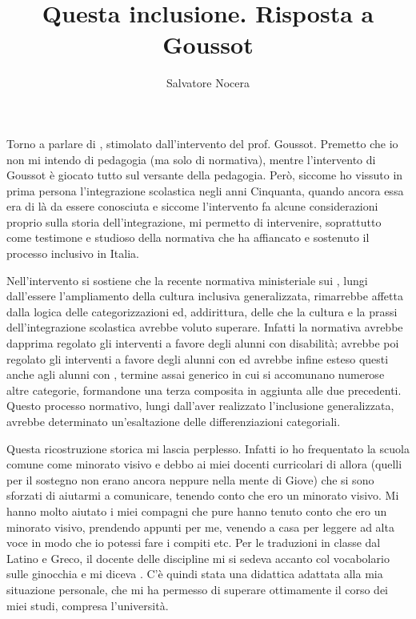 \author{Salvatore Nocera}
\title{Questa inclusione. Risposta a Goussot}
\label{cha:nocera300713}
\maketitle
{}
Torno a parlare di , stimolato dall'intervento del prof. Goussot\pageref{Goussot190713}. Premetto che io non mi intendo di pedagogia (ma solo di normativa), mentre l'intervento di Goussot è giocato tutto sul versante della pedagogia. Però, siccome ho vissuto in prima persona l'integrazione scolastica negli anni Cinquanta, quando ancora essa era di là da essere conosciuta e siccome l'intervento fa alcune considerazioni proprio sulla storia dell'integrazione, mi permetto di intervenire, soprattutto come testimone e studioso della normativa che ha affiancato e sostenuto il processo inclusivo in Italia.

Nell'intervento si sostiene che la recente normativa ministeriale sui , lungi dall'essere l'ampliamento della cultura inclusiva generalizzata, rimarrebbe affetta dalla logica delle categorizzazioni ed, addirittura, delle  che la cultura e la prassi dell'integrazione scolastica avrebbe voluto superare. Infatti la normativa avrebbe dapprima regolato gli interventi a favore degli alunni con disabilità; avrebbe poi regolato gli interventi a favore degli alunni con  ed avrebbe infine esteso questi anche agli alunni con , termine assai generico in cui si accomunano numerose altre categorie, formandone una terza composita in aggiunta alle due precedenti. Questo processo normativo, lungi dall'aver realizzato l'inclusione generalizzata, avrebbe determinato un'esaltazione delle differenziazioni categoriali.

Questa ricostruzione storica mi lascia perplesso. Infatti io ho frequentato la scuola comune come minorato visivo e debbo ai miei docenti curricolari di allora (quelli per il sostegno non erano ancora neppure nella mente di Giove) che si sono sforzati di aiutarmi a comunicare, tenendo conto che ero un minorato visivo. Mi hanno molto aiutato i miei compagni che pure hanno tenuto conto che ero un minorato visivo, prendendo appunti per me, venendo a casa per leggere ad alta voce in modo che io potessi fare i compiti etc. Per le traduzioni in classe dal Latino e Greco, il docente delle discipline mi si sedeva accanto col vocabolario sulle ginocchia e mi diceva . C'è quindi stata una didattica adattata alla mia situazione personale, che mi ha permesso di superare ottimamente il corso dei miei studi, compresa l'università.


